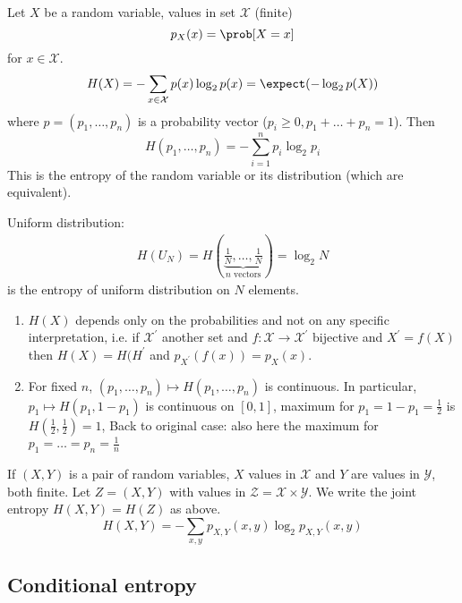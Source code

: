 \documentclass[mfit.tex]{subfiles}
\begin{document}
\begin{defi}
  Let $X$ be a random variable, values in set $\mathcal{X}$ (finite)
  \[ p_X(x) = \prob[X=x] \]
  for $x \in \mathcal{X}$.
  \[ H(X) = - \sum_{x \in \mathcal{X}} p(x) \log_2 p(x)  = \expect(-\log_2 p(X)) \]
  where $p = (p_1,\dots,p_n)$ is a probability vector ($p_i \geq 0, p_1 + \dots + p_n = 1$).
  Then 
  \[ H(p_1,\dots,p_n) = - \sum_{i=1}^n p_i \log_2 p_i \]
  This is the entropy of the random variable or its distribution (which are equivalent).
\end{defi}

Uniform distribution:
\begin{align*}
  H(U_N) = H(\underbrace{\frac{1}{N},\dots,\frac{1}{N}}_{n \text{ vectors}}) = \log_2 N
\end{align*}
is the entropy of uniform distribution on $N$ elements.

\begin{prop}[Properties]
  \begin{enumerate}
    \item $H(X)$ depends only on the probabilities and not on any specific interpretation, i.e.
    if $\mathcal{X}^\prime$ another set and $f: \mathcal{X} \to \mathcal{X}^\prime$ bijective and $X^\prime = f(X)$
    then $H(X) = H(H^\prime$ and $p_{X^\prime}(f(x)) = p_X(x)$.
    \item For fixed $n$, $(p_1,\dots,p_n) \mapsto H(p_1,\dots,p_n)$ is continuous.
    In particular, $p_1 \mapsto H(p_1, 1-p_1)$ is continuous on $[0,1]$,
    maximum for $p_1 = 1 - p_1 = \frac{1}{2}$ is $H(\frac{1}{2},\frac{1}{2}) = 1$,
    Back to original case: also here the maximum for $p_1 = \dots = p_n = \frac{1}{n}$ 
  \end{enumerate}
\end{prop}

If $(X,Y)$ is a pair of random variables, $X$ values in $\mathcal{X}$ and $Y$ are values in $\mathcal{Y}$, both finite.
Let $Z = (X,Y)$ with values in $\mathcal{Z} = \mathcal{X} \times \mathcal{Y}$.
We write the joint entropy $H(X,Y) = H(Z)$ as above.
\[ H(X,Y) = - \sum_{x,y} p_{X,Y} (x,y) \log_2 p_{X,Y}(x,y) \]

\subsection{Conditional entropy}
\end{document}
